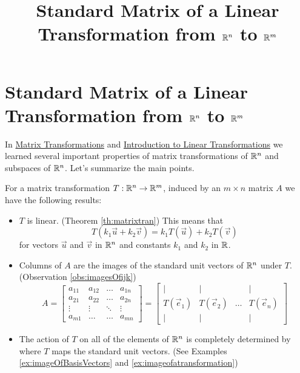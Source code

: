 \documentclass{ximera}
\title{Standard Matrix of a Linear Transformation from $\mathbb{R}^n$ to $\mathbb{R}^m$} \license{CC BY-NC-SA 4.0}
\begin{document}
\begin{abstract}
 \end{abstract}
\maketitle


\section*{Standard Matrix of a Linear Transformation from $\mathbb{R}^n$ to $\mathbb{R}^m$}

In \href{https://ximera.osu.edu/oerlinalg/LinearAlgebra/LTR-0005/main}{Matrix Transformations} and \href{https://ximera.osu.edu/oerlinalg/LinearAlgebra/LTR-0010/main}{Introduction to Linear Transformations} we learned several important properties of matrix transformations of $\mathbb{R}^n$ and subspaces of $\mathbb{R}^n$.  Let's summarize the main points.
\begin{summary}\label{sum:matrixTrans}
For a matrix transformation $T:\mathbb{R}^n\rightarrow\mathbb{R}^m$, induced by an $m\times n$ matrix $A$ we have the following results:
\begin{itemize}
    \item $T$ is linear. (Theorem \ref{th:matrixtran})  This means that 
    $$T(k_1\vec{u}+k_2\vec{v})= k_1T(\vec{u})+k_2T(\vec{v})$$
    for vectors $\vec{u}$ and $\vec{v}$ in $\mathbb{R}^n$ and constants $k_1$ and $k_2$ in $\mathbb{R}$.
    \item Columns of $A$ are the images of the standard unit vectors of $\mathbb{R}^n$ under $T$. (Observation \ref{obs:imagesOfijk})
 \begin{equation*} \label{eq:matlintrans}
 A=\begin{bmatrix}
           a_{11} & a_{12}&\dots&a_{1n}\\
           a_{21}&a_{22} &\dots &a_{2n}\\
		\vdots & \vdots&\ddots &\vdots\\
		a_{m1}&\dots &\dots &a_{mn}
         \end{bmatrix}
		 = 
         \begin{bmatrix}
           | & |& &|\\
		T(\vec{e}_1) & T(\vec{e}_2)&\dots &T(\vec{e}_n)\\
		|&| & &|
         \end{bmatrix}
\end{equation*}
    
    \item The action of $T$ on all of the elements of $\mathbb{R}^n$ is completely determined by where $T$ maps the standard unit vectors. (See Examples \ref{ex:imageOfBasisVectors} and \ref{ex:imageofatransformation})
\end{itemize}
    
\end{summary}
\end{document}
